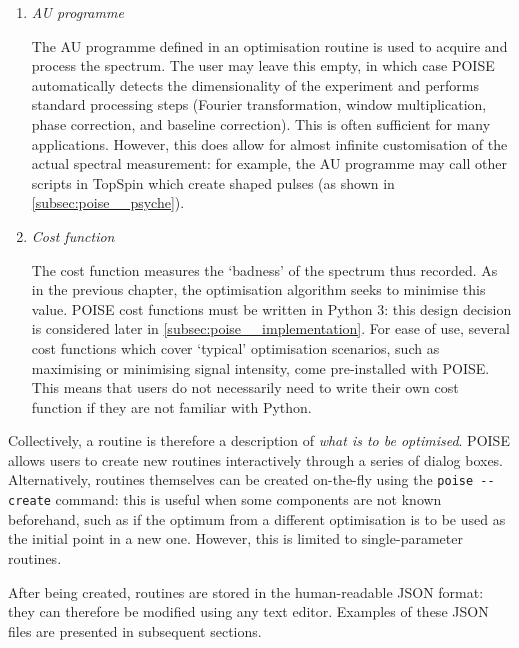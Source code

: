 \begin{enumerate}
    \item \textit{AU programme}

        The AU programme defined in an optimisation routine is used to acquire and process the spectrum.
        The user may leave this empty, in which case POISE automatically detects the dimensionality of the experiment and performs standard processing steps (Fourier transformation, window multiplication, phase correction, and baseline correction).
        This is often sufficient for many applications.
        However, this does allow for almost infinite customisation of the actual spectral measurement: for example, the AU programme may call other scripts in TopSpin which create shaped pulses (as shown in \cref{subsec:poise__psyche}).

    \item \textit{Cost function}

        The cost function measures the `badness' of the spectrum thus recorded.
        As in the previous chapter, the optimisation algorithm seeks to minimise this value.
        POISE cost functions must be written in Python 3: this design decision is considered later in \cref{subsec:poise__implementation}.
        For ease of use, several cost functions which cover `typical' optimisation scenarios, such as maximising or minimising signal intensity, come pre-installed with POISE.
        This means that users do not necessarily need to write their own cost function if they are not familiar with Python.
\end{enumerate}

Collectively, a routine is therefore a description of \textit{what is to be optimised}.
POISE allows users to create new routines interactively through a series of dialog boxes.
Alternatively, routines themselves can be created on-the-fly using the \texttt{poise -\phantom{}-create} command: this is useful when some components are not known beforehand, such as if the optimum from a different optimisation is to be used as the initial point in a new one.
However, this is limited to single-parameter routines.

After being created, routines are stored in the human-readable JSON format: they can therefore be modified using any text editor.
Examples of these JSON files are presented in subsequent sections.

